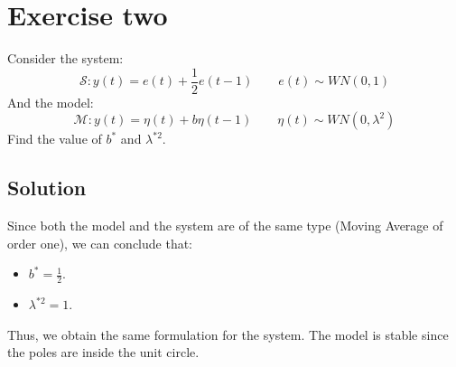 \section{Exercise two}

Consider the system: 
\[\mathcal{S}:y(t)=e(t)+\dfrac{1}{2}e(t-1)\qquad e(t)\sim WN(0,1)\]
And the model: 
\[\mathcal{M}:y(t)=\eta(t)+b\eta(t-1)\qquad \eta(t)\sim WN(0,\lambda^2)\]
Find the value of $b^\ast$ and $\lambda^{\ast 2}$. 

\subsection*{Solution}
Since both the model and the system are of the same type (Moving Average of order one), we can conclude that:
\begin{itemize}
    \item $b^\ast=\frac{1}{2}$. 
    \item $\lambda^{\ast 2}=1$. 
\end{itemize}
Thus, we obtain the same formulation for the system.
The model is stable since the poles are inside the unit circle. 